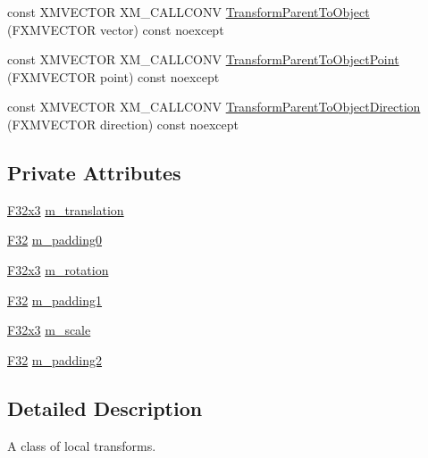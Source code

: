 \begin{DoxyCompactItemize}
\item 
const X\+M\+V\+E\+C\+T\+OR X\+M\+\_\+\+C\+A\+L\+L\+C\+O\+NV \mbox{\hyperlink{classmage_1_1_local_transform_aee4c8c7b54e538a1448224bb36490d0a}{Transform\+Parent\+To\+Object}} (F\+X\+M\+V\+E\+C\+T\+OR vector) const noexcept
\item 
const X\+M\+V\+E\+C\+T\+OR X\+M\+\_\+\+C\+A\+L\+L\+C\+O\+NV \mbox{\hyperlink{classmage_1_1_local_transform_a869e0acb9947f74405bad09164182373}{Transform\+Parent\+To\+Object\+Point}} (F\+X\+M\+V\+E\+C\+T\+OR point) const noexcept
\item 
const X\+M\+V\+E\+C\+T\+OR X\+M\+\_\+\+C\+A\+L\+L\+C\+O\+NV \mbox{\hyperlink{classmage_1_1_local_transform_a237b0811672ffc8dd611e6a56af24c18}{Transform\+Parent\+To\+Object\+Direction}} (F\+X\+M\+V\+E\+C\+T\+OR direction) const noexcept
\end{DoxyCompactItemize}
\subsection*{Private Attributes}
\begin{DoxyCompactItemize}
\item 
\mbox{\hyperlink{namespacemage_a1e3c7a882af461f161caa1cbddaf1fa2}{F32x3}} \mbox{\hyperlink{classmage_1_1_local_transform_af467d4a331c7215cf016e31bd91c42db}{m\+\_\+translation}}
\item 
\mbox{\hyperlink{namespacemage_aa97e833b45f06d60a0a9c4fc22ae02c0}{F32}} \mbox{\hyperlink{classmage_1_1_local_transform_a408d86574aca8976ca123b992118c6f8}{m\+\_\+padding0}}
\item 
\mbox{\hyperlink{namespacemage_a1e3c7a882af461f161caa1cbddaf1fa2}{F32x3}} \mbox{\hyperlink{classmage_1_1_local_transform_ac4825a600646e0bb3db5a4699db5f5e1}{m\+\_\+rotation}}
\item 
\mbox{\hyperlink{namespacemage_aa97e833b45f06d60a0a9c4fc22ae02c0}{F32}} \mbox{\hyperlink{classmage_1_1_local_transform_a3b2b212788e819fb6ac46322c15e002e}{m\+\_\+padding1}}
\item 
\mbox{\hyperlink{namespacemage_a1e3c7a882af461f161caa1cbddaf1fa2}{F32x3}} \mbox{\hyperlink{classmage_1_1_local_transform_aca17d055c29e408606e199425bd2ee2a}{m\+\_\+scale}}
\item 
\mbox{\hyperlink{namespacemage_aa97e833b45f06d60a0a9c4fc22ae02c0}{F32}} \mbox{\hyperlink{classmage_1_1_local_transform_ad293dda4a1c7bfec90267915937aec90}{m\+\_\+padding2}}
\end{DoxyCompactItemize}


\subsection{Detailed Description}
A class of local transforms. 

